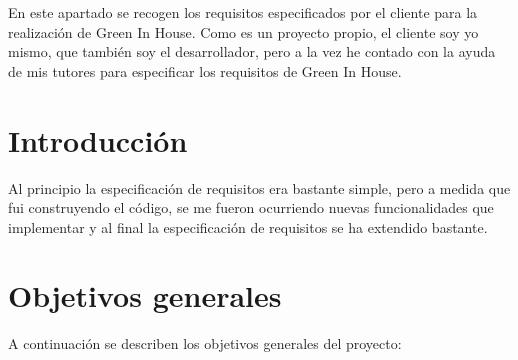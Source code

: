 En este apartado se recogen los requisitos especificados por el cliente para la realización de Green In House. Como es un proyecto propio, el cliente soy yo mismo, que también soy el desarrollador, pero a la vez he contado con la ayuda de mis tutores para especificar los requisitos de Green In House.

\section{Introducción}
Al principio la especificación de requisitos era bastante simple, pero a medida que fui construyendo el código, se me fueron ocurriendo nuevas funcionalidades que implementar y al final la especificación de requisitos se ha extendido bastante.

\section{Objetivos generales}
A continuación se describen los objetivos generales del proyecto:
